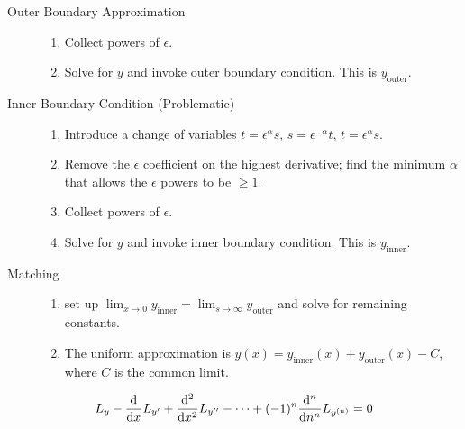 \item[Boundary Layers] \hfill
  \begin{description}
  \item [Outer Boundary Approximation] \hfill
    \begin{enumerate}
    \item Collect powers of $\epsilon$.
    \item Solve for $y$ and invoke outer boundary condition. This is
      $y_{\text{outer}}$.
    \end{enumerate}
  \item[Inner Boundary Condition (Problematic)] \hfill
    \begin{enumerate}
    \item Introduce a change of variables $t=\epsilon^{\alpha}s$,
      $s=\epsilon^{-\alpha}t$, $t=\epsilon^{\alpha}s$.
    \item Remove the $\epsilon$ coefficient on the highest derivative; find the
      minimum $\alpha$ that allows the $\epsilon$ powers to be $\ge1$.
    \item Collect powers of $\epsilon$.
    \item Solve for $y$ and invoke inner boundary condition. This is
      $y_{\text{inner}}$.
    \end{enumerate}
  \item[Matching] \hfill
    \begin{enumerate}
    \item set up
      $\lim_{x\rightarrow0}y_{\text{inner}}=\lim_{s\rightarrow\infty}y_{\text{outer}}$
      and solve for remaining constants.
    \item The uniform approximation is $y(x)=y_{\text{inner}}(x) +
      y_{\text{outer}}(x)-C$, where $C$ is the common limit.
    \end{enumerate}
  \end{description}
\item[Euler Equation]
  $$L_y-\od{}{x}L_{y'}+\od[2]{}{x}L_{y''}-\cdots+(-1)^n\od[n]{}{n}L_{y^{(n)}}=0$$
